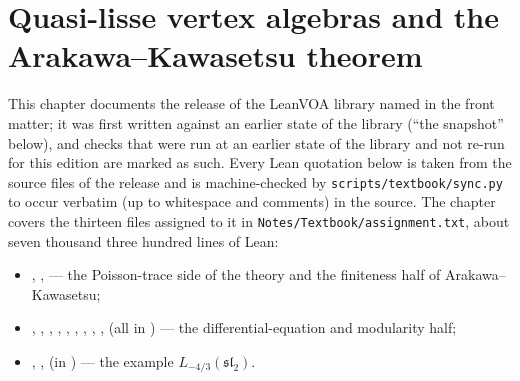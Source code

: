\chapter{Quasi-lisse vertex algebras and the Arakawa--Kawasetsu theorem}\label{ch:L16}
\begingroup\setlength{\emergencystretch}{3em}\sloppy

\providecommand{\lsixteenvac}{\mathbf{1}}
\providecommand{\lsixteenHP}{\mathrm{HP}_0}
\providecommand{\lsixteensl}{\mathfrak{sl}_2}
\providecommand{\lsixteenCas}{\mathrm{Cas}}
\providecommand{\lsixteenNil}{\mathcal{N}}
\providecommand{\lsixteenR}{R}
\providecommand{\lsixteenVA}{V_{\mathcal A}}
\providecommand{\lsixteenOq}{O_q(V)}

This chapter documents the release of the LeanVOA library named in the front matter; it was first written against an earlier state of the library (``the snapshot'' below), and checks that were
run at an earlier state of the library and not re-run for this edition are marked as such. Every Lean quotation below is taken from the source files of the release
and is machine-checked by \texttt{scripts/textbook/sync.py} to occur verbatim (up to whitespace and
comments) in the source. The chapter covers the thirteen files assigned to it in
\texttt{Notes/Textbook/assignment.txt}, about seven thousand three hundred lines of Lean:
\begin{itemize}
\item {},
  ,
   --- the Poisson-trace side of the
  theory and the finiteness half of Arakawa--Kawasetsu;
\item {},
  , , ,
  , , ,
  , , 
  (all in ) --- the differential-equation and modularity half;
\item {},
  ,  (in
  ) --- the example $L_{-4/3}(\lsixteensl)$.
\end{itemize}

